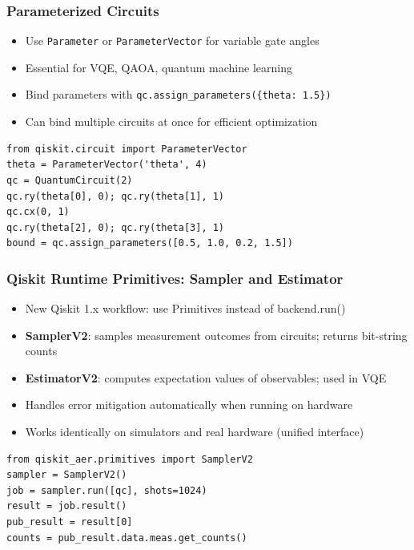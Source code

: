 \begin{frame}[fragile]\frametitle{Parameterized Circuits}
\begin{itemize}
\item Use \texttt{Parameter} or \texttt{ParameterVector} for variable gate angles
\item Essential for VQE, QAOA, quantum machine learning
\item Bind parameters with \texttt{qc.assign\_parameters(\{theta: 1.5\})}
\item Can bind multiple circuits at once for efficient optimization
\end{itemize}
\begin{verbatim}
from qiskit.circuit import ParameterVector
theta = ParameterVector('theta', 4)
qc = QuantumCircuit(2)
qc.ry(theta[0], 0); qc.ry(theta[1], 1)
qc.cx(0, 1)
qc.ry(theta[2], 0); qc.ry(theta[3], 1)
bound = qc.assign_parameters([0.5, 1.0, 0.2, 1.5])
\end{verbatim}
\end{frame}

\begin{frame}[fragile]\frametitle{Qiskit Runtime Primitives: Sampler and Estimator}
\begin{itemize}
\item New Qiskit 1.x workflow: use Primitives instead of backend.run()
\item \textbf{SamplerV2}: samples measurement outcomes from circuits; returns bit-string counts
\item \textbf{EstimatorV2}: computes expectation values of observables; used in VQE
\item Handles error mitigation automatically when running on hardware
\item Works identically on simulators and real hardware (unified interface)
\end{itemize}
\begin{verbatim}
from qiskit_aer.primitives import SamplerV2
sampler = SamplerV2()
job = sampler.run([qc], shots=1024)
result = job.result()
pub_result = result[0]
counts = pub_result.data.meas.get_counts()
\end{verbatim}
\end{frame}

